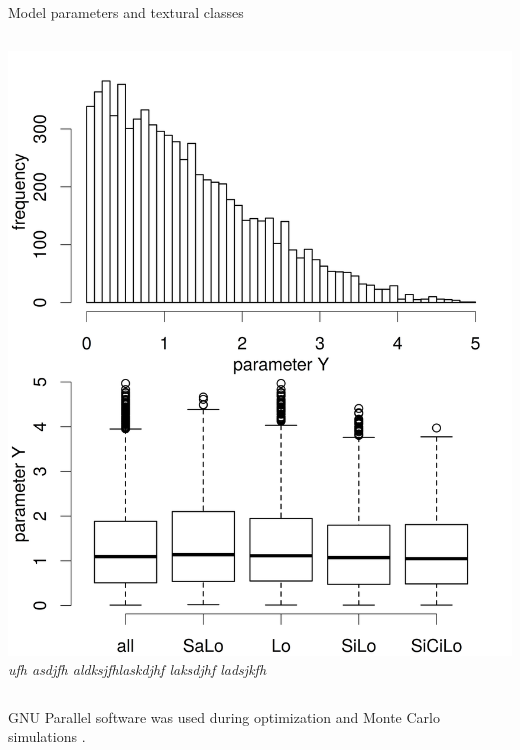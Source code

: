 \begin{block}{Model parameters and textural classes}
\begin{columns}
\begin{column}{0.25\textwidth}
            \includegraphics[width = \textwidth]{obr/mc_y.png}
            {\it ufh asdjfh aldksjfhlaskdjhf laksdjhf ladsjkfh }
        \end{column}
    \end{columns}
    GNU Parallel software was used during optimization and Monte Carlo simulations \citep{Tange2011a}. 
\end{block}
















